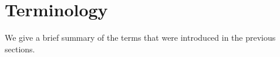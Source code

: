 
 


\section{Terminology}\label{sect:terminology}

We give a brief summary of the terms that were introduced in the previous sections.

